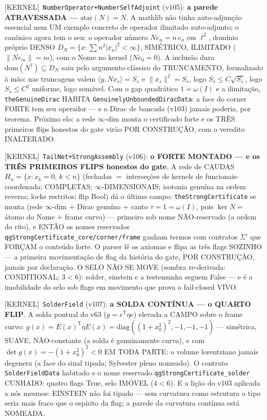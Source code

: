 \documentclass[11pt]{article}
\providecommand{\kernelmk}[1]{\textsf{[KERNEL]}~\texttt{#1}}\providecommand{\knownmk}[1]{\textsf{[KNOWN]}~{#1}}\providecommand{\statusmk}[1]{\textsf{[#1]}}
\theoremstyle{definition}\newtheorem{deriv}{Derivação}
\begin{document}
\kernelmk{NumberOperator+\allowbreak NumberSelfAdjoint} (v105): \textbf{a parede ATRAVESSADA --- $\mathrm{star}(N)=N$}. A mathlib não tinha auto-adjunção essencial nem UM exemplo concreto de operador ilimitado auto-adjunto; o canônico agora tem o seu: o operador número $Ne_n=n\,e_n$ em $\ell^2$, domínio próprio DENSO $D_N=\{x:\sum n^2|x_n|^2<\infty\}$, SIMÉTRICO, ILIMITADO ($\|Ne_m\|=m$), com o Nome no kernel ($Ne_0=0$). A inclusão dura $\mathrm{dom}(N^\dagger)\subseteq D_N$ saiu pelo argumento clássico do TRUNCAMENTO, formalizado à mão: nas truncagens valem $\langle y,Nx_s\rangle=S_s$ e $\|x_s\|^2=S_s$, logo $S_s\le C\sqrt{S_s}$, logo $S_s\le C^2$ uniforme, logo somável. Com o gap quadrático $1=\omega(I)$ e a ilimitação, \texttt{theGenuineDirac} HABITA \texttt{GenuinelyUnboundedDiracData}: a face do corner FORTE tem seu operador --- e o Dirac de bancada (v103) jamais poderia, por teorema. Próximo elo: a rede $\infty$-dim monta o certificado forte e os TRÊS primeiros flips honestos do gate virão POR CONSTRUÇÃO, com o veredito INALTERADO.

\kernelmk{TailNet+\allowbreak StrongAssembly} (v106): \textbf{o FORTE MONTADO --- e os TRÊS PRIMEIROS FLIPS honestos do gate}. A rede de CAUDAS $H_n=\{x:x_k=0,\,k<n\}$ (fechadas $=$ interseções de kernels de funcionais-coordenada; COMPLETAS; $\infty$-DIMENSIONAIS; isotonia genuína na ordem reversa; locks restritos; flip Bool) dá o último campo: \texttt{theStrongCertificate} se monta (rede $\infty$-dim $+$ Dirac genuíno $+$ canto $\tau=1=\omega(I)$, pois $\ker N=$ átomo do Nome $+$ frame curvo) --- primeiro sob nome NÃO-reservado (a ordem do rito), e ENTÃO os nomes reservados \texttt{qgStrongCertificate\_core/corner/frame} ganham termos com contratos $\Sigma'$ que FORÇAM o conteúdo forte. O parser lê os axiomas e flipa as três flags SOZINHO --- a primeira movimentação de flag da história do gate, POR CONSTRUÇÃO, jamais por declaração. O SELO NÃO SE MOVE (sombra re-derivada: CONDITIONAL; $3<6$): solder, einstein e a testemunha seguem False --- e é a imobilidade do selo sob flags em movimento que prova o fail-closed VIVO.

\kernelmk{SolderField} (v107): \textbf{a SOLDA CONTÍNUA --- o QUARTO FLIP}. A solda pontual do v63 ($g=e^{\mathsf{T}}\eta e$) elevada a CAMPO sobre o frame curvo: $g(x)=E(x)^{\mathsf{T}}\eta E(x)=\mathrm{diag}((1+x_0^2)^2,-1,-1,-1)$ --- simétrica, SUAVE, NÃO-constante (a solda é genuinamente curva), e com $\det g(x)=-(1+x_0^2)^2<0$ EM TODA PARTE: o volume lorentziano jamais degenera (a face do sinal tipada; Sylvester pleno nomeado). O contrato \texttt{SolderFieldData} habitado e o nome reservado \texttt{qgStrongCertificate\_solder} CUNHADO: quatro flags True, selo IMÓVEL ($4<6$). E a lição do v103 aplicada a nós mesmos: EINSTEIN não foi tipado --- sem curvatura como estrutura o tipo seria mais fraco que o espírito da flag; a parede da curvatura contínua está NOMEADA.
\end{document}
